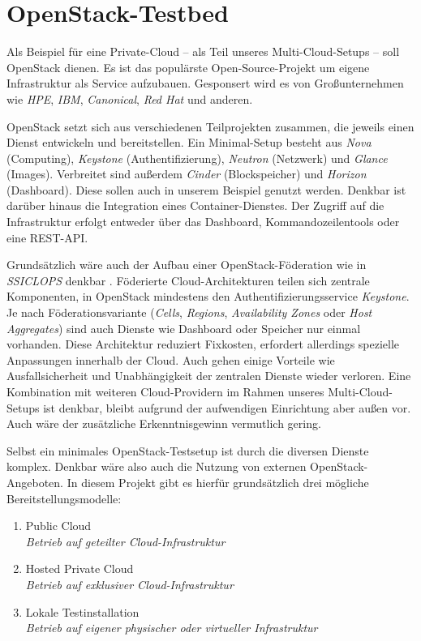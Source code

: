 \section{OpenStack-Testbed}

Als Beispiel für eine Private-Cloud -- als Teil unseres Multi-Cloud-Setups -- soll OpenStack dienen. Es ist das populärste Open-Source-Projekt um eigene Infrastruktur als Service aufzubauen. Gesponsert wird es von Großunternehmen wie \emph{HPE}, \emph{IBM}, \emph{Canonical}, \emph{Red Hat} und anderen.

OpenStack setzt sich aus verschiedenen Teilprojekten zusammen, die jeweils einen Dienst entwickeln und bereitstellen. Ein Minimal-Setup besteht aus \emph{Nova} (Computing), \emph{Key\-stone} (Authentifizierung), \emph{Neutron} (Netzwerk) und \emph{Glance} (Images). Verbreitet sind außerdem \emph{Cinder} (Blockspeicher) und \emph{Horizon} (Dash\-board). Diese sollen auch in unserem Beispiel genutzt werden. Denkbar ist darüber hinaus die Integration eines Container-Dienstes. Der Zugriff auf die Infrastruktur erfolgt entweder über das Dashboard, Kommandozeilentools oder eine REST-API.

Grundsätzlich wäre auch der Aufbau einer OpenStack-Föderation wie in \emph{SSICLOPS} denkbar \cite{ssiclops:2015:d6.1-project-presentation}. Föderierte Cloud-Architekturen teilen sich zentrale Komponenten, in OpenStack mindestens den Authentifizierungsservice \emph{Keystone}. Je nach Föderationsvariante (\emph{Cells}, \emph{Regions}, \emph{Availability Zones} oder \emph{Host Aggregates}) sind auch Dienste wie Dashboard oder Speicher nur einmal vorhanden. Diese Architektur reduziert Fixkosten, erfordert allerdings spezielle Anpassungen innerhalb der Cloud. Auch gehen einige Vorteile wie Ausfallsicherheit und Unabhängigkeit der zentralen Dienste wieder verloren. Eine Kombination mit weiteren Cloud-Providern im Rahmen unseres Multi-Cloud-Setups ist denkbar, bleibt aufgrund der aufwendigen Einrichtung aber außen vor. Auch wäre der zusätzliche Erkenntnisgewinn vermutlich gering.

Selbst ein minimales OpenStack-Testsetup ist durch die diversen Dienste komplex. Denkbar wäre also auch die Nutzung von externen OpenStack-Angeboten. In diesem Projekt gibt es hierfür grundsätzlich drei mögliche Bereitstellungsmodelle: 

\begin{enumerate}
	\item Public Cloud
	\\\emph{Betrieb auf geteilter Cloud-Infrastruktur}
	
	\item Hosted Private Cloud
	\\\emph{Betrieb auf exklusiver Cloud-Infrastruktur}
	
	\item Lokale Testinstallation
	\\\emph{Betrieb auf eigener physischer oder virtueller Infrastruktur}
\end{enumerate}

